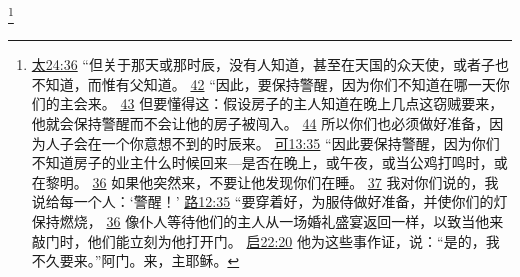 \documentclass[12pt, a4paper, oneside]{ctexart}
\begin{document}
	\footnote {
		\href{https://biblehub.com/matthew/24-36.htm}{太24:36} “但关于那天或那时辰，没有人知道，甚至在天国的众天使，或者子也不知道，而惟有父知道。
		\href{https://biblehub.com/matthew/24-42.htm}{42} “因此，要保持警醒，因为你们不知道在哪一天你们的主会来。
		\href{https://biblehub.com/matthew/24-43.htm}{43} 但要懂得这：假设房子的主人知道在晚上几点这窃贼要来，他就会保持警醒而不会让他的房子被闯入。
		\href{https://biblehub.com/matthew/24-44.htm}{44} 所以你们也必须做好准备，因为人子会在一个你意想不到的时辰来。
		\href{https://biblehub.com/mark/13-35.htm}{可13:35} “因此要保持警醒，因为你们不知道房子的业主什么时候回来---是否在晚上，或午夜，或当公鸡打鸣时，或在黎明。
		\href{https://biblehub.com/mark/13-36.htm}{36} 如果他突然来，不要让他发现你们在睡。
		\href{https://biblehub.com/mark/13-37.htm}{37} 我对你们说的，我说给每一个人：‘警醒！’
		\href{https://biblehub.com/luke/12-35.htm}{路12:35} “要穿着好，为服侍做好准备，并使你们的灯保持燃烧，
		\href{https://biblehub.com/luke/12-36.htm}{36} 像仆人等待他们的主人从一场婚礼盛宴返回一样，以致当他来敲门时，他们能立刻为他打开门。
		\href{https://biblehub.com/revelation/22-20.htm}{启22:20} 他为这些事作证，说：“是的，我不久要来。”阿门。来，主耶稣。
	}
\thispagestyle{empty}
\newpage
\end{document}
